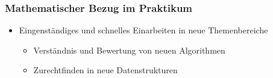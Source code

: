 
\begin{frame}[t] \frametitle{Mathematischer Bezug im Praktikum}
  \vspace{1cm}
  \begin{itemize}
  \item Eingenst\"andiges und schnelles Einarbeiten in neue Themenbereiche
    \begin{itemize}
    \item Verst\"andnis und Bewertung von neuen Algorithmen
    \item Zurechtfinden in neue Datenstrukturen
    \end{itemize}
  \end{itemize}
\end{frame}

